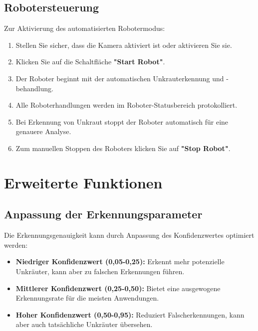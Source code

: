 \documentclass[12pt, a4paper]{scrreprt}
\begin{document}
\subsection{Robotersteuerung}
Zur Aktivierung des automatisierten Robotermodus:
\begin{enumerate}
    \item Stellen Sie sicher, dass die Kamera aktiviert ist oder aktivieren Sie sie.
    \item Klicken Sie auf die Schaltfläche \textbf{"Start Robot"}.
    \item Der Roboter beginnt mit der automatischen Unkrauterkennung und -behandlung.
    \item Alle Roboterhandlungen werden im Roboter-Statusbereich protokolliert.
    \item Bei Erkennung von Unkraut stoppt der Roboter automatisch für eine genauere Analyse.
    \item Zum manuellen Stoppen des Roboters klicken Sie auf \textbf{"Stop Robot"}.
\end{enumerate}

\section{Erweiterte Funktionen}

\subsection{Anpassung der Erkennungsparameter}
Die Erkennungsgenauigkeit kann durch Anpassung des Konfidenzwertes optimiert werden:
\begin{itemize}
    \item \textbf{Niedriger Konfidenzwert (0,05-0,25):} Erkennt mehr potenzielle Unkräuter, kann aber zu falschen Erkennungen führen.
    \item \textbf{Mittlerer Konfidenzwert (0,25-0,50):} Bietet eine ausgewogene Erkennungsrate für die meisten Anwendungen.
    \item \textbf{Hoher Konfidenzwert (0,50-0,95):} Reduziert Falscherkennungen, kann aber auch tatsächliche Unkräuter übersehen.
\end{itemize}
\end{document}
